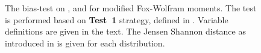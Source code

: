 \begin{figure}[htbp!]
    \centering
    \ContinuedFloat
{}
\caption{\label{fig:cleo_cones_test1} The bias-test on \EB, \Estar and \Mbc for modified Fox-Wolfram moments.
The test is performed based on \textbf{Test~1} strategy, defined in .
Variable definitions are given in the text.
The Jensen Shannon distance as introduced in  is given for each distribution.
}
\end{figure}
